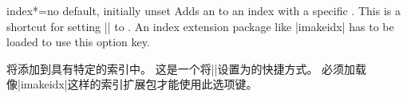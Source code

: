 \begin{docTcbKey}[][doc new=2018-07-26]{index*}{=}{no default, initially unset}
Adds an  to an index with a specific .
This is a shortcut for  setting |\index| to .
An index extension package like |imakeidx| has to be loaded to use  this option key.

将添加到具有特定的索引中。
这是一个将|\index|设置为的快捷方式。
必须加载像|imakeidx|这样的索引扩展包才能使用此选项键。
\end{docTcbKey}

